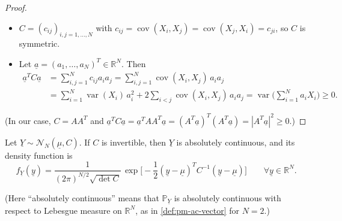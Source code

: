 \begin{proof}
\begin{itemize}
  \item $C=(c_{ij})_{i,j=1,\dots,N}$ with $c_{ij}=\operatorname{cov}(X_i,X_j)=\operatorname{cov}(X_j,X_i)=c_{ji}$,
    so $C$ is symmetric.
  \item Let $\underline a=(a_1,\dots,a_N)^T\in\mathbb R^N$. Then
    \[
    \begin{aligned}
      \underline a^TC\underline a&=\sum_{i,j=1}^Nc_{ij}a_ia_j=\sum_{i,j=1}^N\operatorname{cov}(X_i,X_j)\,a_ia_j\\
      &=\sum_{i=1}^N\operatorname{var}(X_i)\,a_i^2+2\sum_{i<j}\operatorname{cov}(X_i,X_j)\,a_ia_j
      =\operatorname{var}\Big(\sum_{i=1}^Na_iX_i\Big)\ge0 .
    \end{aligned}
    \]
\end{itemize}
(In our case, $C=AA^T$ and $\underline a^TC\underline a=\underline a^TAA^T\underline a
=(A^T\underline a)^T(A^T\underline a)=|A^T\underline a|^2\ge0$.)
\end{proof}

\begin{theorem}\label{thm:gv-density}
Let $\underline Y\sim\mathcal N_N(\underline\mu,C)$. If $C$ is invertible, then $\underline Y$ is
absolutely continuous, and its density function is
\begin{equation}\label{eq:gv-density}
  f_{\underline Y}(\underline y)=\frac1{(2\pi)^{N/2}\sqrt{\det C}}\,
  \exp\Big[-\frac12(\underline y-\underline\mu)^TC^{-1}(\underline y-\underline\mu)\Big]
  \qquad\forall\underline y\in\mathbb R^N .
\end{equation}
\end{theorem}

(Here ``absolutely continuous'' means that $\mathbb P_{\underline Y}$ is absolutely continuous
with respect to Lebesgue measure on $\mathbb R^N$, as in \cref{def:pm-ac-vector} for $N=2$.)

